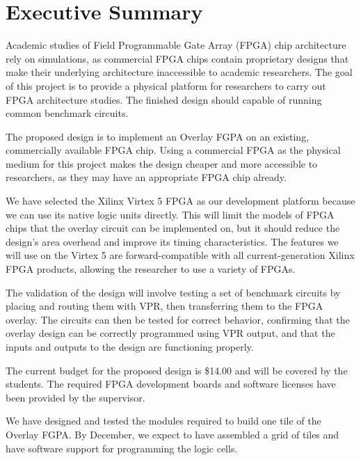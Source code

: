 \thispagestyle{empty}
\section*{Executive Summary}


Academic studies of Field Programmable Gate Array (FPGA) chip architecture rely on simulations, as commercial FPGA chips contain proprietary designs that make their underlying architecture inaccessible to academic researchers.
The goal of this project is to provide a physical platform for researchers to carry out FPGA architecture studies.
The finished design should capable of running common benchmark circuits.

The proposed design is to implement an Overlay FGPA on an existing, commercially available FPGA chip.
Using a commercial FPGA as the physical medium for this project makes the design cheaper and more accessible to researchers, as they may have an appropriate FPGA chip already.


We have selected the Xilinx Virtex 5 FPGA as our development platform because we can use its native logic units directly.
This will limit the models of FPGA chips that the overlay circuit can be implemented on, but it should reduce the design's area overhead and improve its timing characteristics.
The features we will use on the Virtex 5 are forward-compatible with all current-generation Xilinx FPGA products, allowing the researcher to use a variety of FPGAs.

The validation of the design will involve testing a set of benchmark circuits by placing and routing them with VPR, then transferring them to the FPGA overlay.
The circuits can then be tested for correct behavior, confirming that the overlay design can be correctly programmed using VPR output, and that the inputs and outputs to the design are functioning properly.

The current budget for the proposed design is \$14.00 and will be covered by the students.
The required FPGA development boards and software licenses have been provided by the supervisor.

We have designed and tested the modules required to build one tile of the Overlay FGPA.
By December, we expect to have assembled a grid of tiles and have software support for programming the logic cells.

